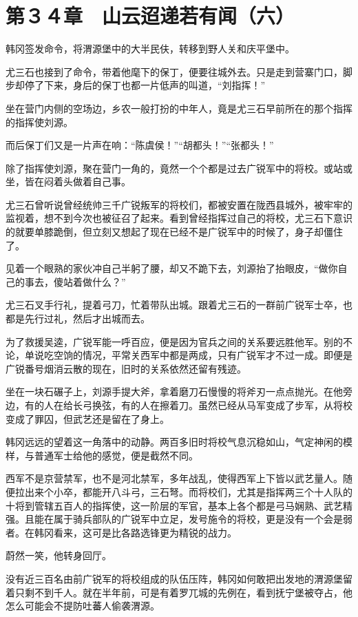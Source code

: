 \section{第３４章　山云迢递若有闻（六）}

韩冈签发命令，将渭源堡中的大半民伕，转移到野人关和庆平堡中。

尤三石也接到了命令，带着他麾下的保丁，便要往城外去。只是走到营寨门口，脚步却停了下来，身后的保丁也都一片低声的叫道，“刘指挥！”

坐在营门内侧的空场边，乡农一般打扮的中年人，竟是尤三石早前所在的那个指挥的指挥使刘源。

而后保丁们又是一片声在响：“陈虞侯！”“胡都头！”“张都头！”

除了指挥使刘源，聚在营门一角的，竟然一个个都是过去广锐军中的将校。或站或坐，皆在闷着头做着自己事。

尤三石曾听说曾经统帅三千广锐叛军的将校们，都被安置在陇西县城外，被牢牢的监视着，想不到今次也被征召了起来。看到曾经指挥过自己的将校，尤三石下意识的就要单膝跪倒，但立刻又想起了现在已经不是广锐军中的时候了，身子却僵住了。

见着一个眼熟的家伙冲自己半躬了腰，却又不跪下去，刘源抬了抬眼皮，“做你自己的事去，傻站着做什么？”

尤三石叉手行礼，提着弓刀，忙着带队出城。跟着尤三石的一群前广锐军士卒，也都是先行过礼，然后才出城而去。

为了救援吴逵，广锐军能一呼百应，便是因为官兵之间的关系要远胜他军。别的不论，单说吃空饷的情况，平常关西军中都是两成，只有广锐军才不过一成。即便是广锐番号烟消云散的现在，旧时的关系依然还留有残迹。

坐在一块石碾子上，刘源手提大斧，拿着磨刀石慢慢的将斧刃一点点抛光。在他旁边，有的人在给长弓换弦，有的人在擦着刀。虽然已经从马军变成了步军，从将校变成了罪囚，但武艺还是留在了身上。

韩冈远远的望着这一角落中的动静。两百多旧时将校气息沉稳如山，气定神闲的模样，与普通军士给他的感觉，便是截然不同。

西军不是京营禁军，也不是河北禁军，多年战乱，使得西军上下皆以武艺量人。随便拉出来个小卒，都能开八斗弓，三石弩。而将校们，尤其是指挥两三个十人队的十将到管辖五百人的指挥使，这一阶层的军官，基本上各个都是弓马娴熟、武艺精强。且能在属于骑兵部队的广锐军中立足，发号施令的将校，更是没有一个会是弱者。在韩冈看来，这可是比各路选锋更为精锐的战力。

蔚然一笑，他转身回厅。

没有近三百名由前广锐军的将校组成的队伍压阵，韩冈如何敢把出发地的渭源堡留着只剩不到千人。就在半年前，可是有着罗兀城的先例在，看到抚宁堡被夺占，他怎么可能会不提防吐蕃人偷袭渭源。


